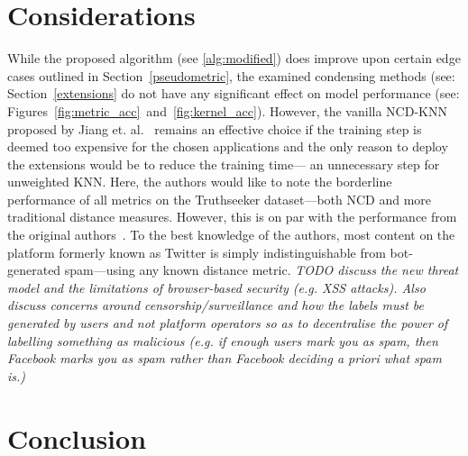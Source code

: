 \documentclass[preprint,12pt]{elsarticle}
\newcommand{\cm}[1]{\textit{{\color{blue}#1}}}
\begin{document}
\section{Considerations}
\label{considerations}
While the proposed algorithm (see \ref{alg:modified}) does improve upon certain edge cases outlined in Section~\ref{pseudometric}, the examined condensing methods (see: Section~\ref{extensions} do not have any significant effect on model performance (see: Figures~\ref{fig:metric_acc}~and~\ref{fig:kernel_acc}).
However, the vanilla NCD-KNN proposed by Jiang et. al.~\cite{jiang2022less} remains an effective choice if the training step is deemed too expensive for the chosen applications and the only reason to deploy the extensions would be to reduce the training time--- an unnecessary step for unweighted KNN.
Here, the authors would like to note the borderline performance of all metrics on the Truthseeker dataset---both NCD and more traditional distance measures.
However, this is on par with the performance from the original authors~\cite{truthseeker}.
To the best knowledge of the authors, most content on the platform formerly known as Twitter is simply indistinguishable from bot-generated spam---using any known distance metric.
\cm{TODO discuss the new threat model  and the limitations of browser-based security (e.g. XSS attacks). Also discuss concerns around censorship/surveillance and how the labels must be generated by users and not platform operators so as to decentralise the power of labelling something as malicious (e.g. if enough users mark you as spam, then Facebook marks you as spam rather than Facebook deciding a priori what spam is.)}
\section{Conclusion}
\label{conclusion}
\end{document}
